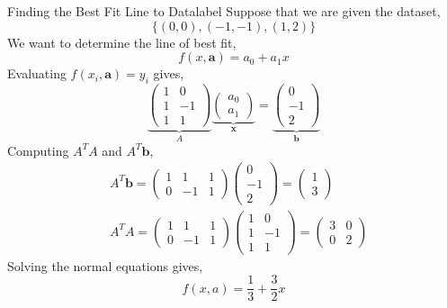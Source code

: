 \NewLine

\begin{ex}{Finding the Best Fit Line to Data}{label}
	Suppose that we are given the dataset,
	\[\{(0,0), (-1,-1), (1,2)\}\]
	We want to determine the line of best fit,
	\[f(x, \mathbf{a}) = a_0 + a_1 x\]
	Evaluating $f(x_i, \mathbf{a}) = y_i$ gives,
	\[\underbrace{\left(\begin{array}{cc}1 & 0 \\ 1 & -1 \\ 1 & 1\end{array}\right)}_A \underbrace{\left(\begin{array}{l}a_0 \\ a_1\end{array}\right)}_{\boldsymbol{x}}=\underbrace{\left(\begin{array}{c}0 \\ -1 \\ 2\end{array}\right)}_{\boldsymbol{b}}\]
	Computing $A^T A$ and $A^T \mathbf{b}$,
	\begin{align*}
		&A^T \boldsymbol{b}=\left(\begin{array}{ccc}1 & 1 & 1 \\ 0 & -1 & 1\end{array}\right)\left(\begin{array}{c}0 \\ -1 \\ 2\end{array}\right)=\left(\begin{array}{l}1 \\ 3\end{array}\right) \\
		&A^T A=\left(\begin{array}{ccc}1 & 1 & 1 \\ 0 & -1 & 1\end{array}\right)\left(\begin{array}{cc}1 & 0 \\ 1 & -1 \\ 1 & 1\end{array}\right)=\left(\begin{array}{ll}3 & 0 \\ 0 & 2\end{array}\right)
	\end{align*}
	Solving the normal equations gives,
	\[f(x, a)=\frac{1}{3}+\frac{3}{2} x\]
\end{ex}

\NewLine

